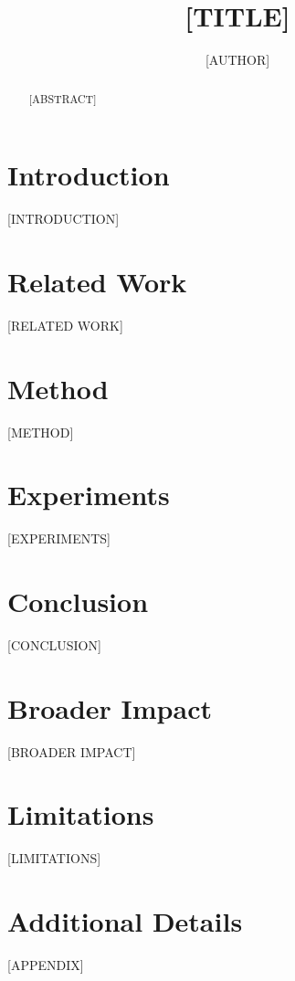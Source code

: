 \documentclass{article}
\title{[TITLE]}
\author{[AUTHOR]}
\affiliation{[AFFILIATION]}
\theoremstyle{plain}
\theoremstyle{definition}
\theoremstyle{remark}
\begin{document}
\maketitle

\begin{abstract}
[ABSTRACT]
\end{abstract}

\section{Introduction}
\label{sec:intro}
[INTRODUCTION]

\section{Related Work}
\label{sec:related}
[RELATED WORK]

\section{Method}
\label{sec:method}
[METHOD]

\section{Experiments}
\label{sec:experiments}
[EXPERIMENTS]

\section{Conclusion}
\label{sec:conclusion}
[CONCLUSION]

\section*{Broader Impact}
[BROADER IMPACT]

\section*{Limitations}
[LIMITATIONS]




\appendix
\section{Additional Details}
[APPENDIX]
\end{document}
